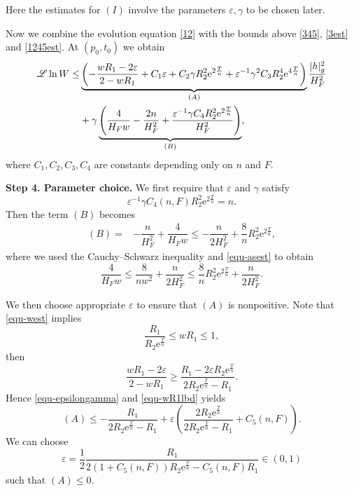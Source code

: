 \documentclass[10pt,a4paper]{amsart}
\numberwithin{equation}{section}
\begin{document}
		Here the estimates for $(I)$ involve the parameters $\varepsilon,\gamma$ to be chosen later.
		
		Now we combine the evolution equation \eqref{12} with the bounds above \eqref{345}, \eqref{3est} and \eqref{1245est}. At $(p_0,t_0)$ we obtain
		\begin{align}
			\mathscr{L} \ln W \leq& \underbrace{ \left(-\dfrac{wR_1-2\varepsilon}{2-wR_1} + C_1\varepsilon + C_2\gamma R_2^2 \mathrm{e}^{2\frac{T}{n}} + \varepsilon^{-1}\gamma^2 C_3R_2^4\mathrm{e}^{4\frac{T}{n}} \right)}_{(A)}\dfrac{|h|_{g}^2}{H_F^2} \notag\\
			&+\gamma\underbrace{\left( \dfrac{4}{H_F w}-\dfrac{2n}{H_F^2} + \dfrac{\varepsilon^{-1}\gamma C_4R_2^2\mathrm{e}^{2\frac{T}{n}}}{H_F^2} \right)}_{(B)}, \label{equ-lnww}
		\end{align}
		where $C_1,C_2,C_3,C_4$ are constants depending only on $n$ and $F$.
		
		\textbf{Step 4. Parameter choice.}
		We first require that $\varepsilon$ and $\gamma$ satisfy
		\begin{equation}
			\varepsilon^{-1}\gamma C_4(n,F)R_2^2\mathrm{e}^{2\frac{T}{n}}=n.
			\label{equ-epsilongamma}
		\end{equation}
		Then the term $(B)$ becomes
		\begin{align*}
			(B) =& - \dfrac{n}{H_F^2} + \dfrac{4}{H_F w} 
			\leq  -\dfrac{n}{2H_F^2} + \dfrac{8}{n}R_2^2\mathrm{e}^{2\frac{T}{n}}, %
		\end{align*}
		where we used the Cauchy--Schwarz inequality and \eqref{equ-asest} to obtain
		\begin{equation*}
			\dfrac{4}{H_F w} \leq \dfrac{8}{nw^2} + \dfrac{n}{2H_F^2} \leq \dfrac{8}{n}R_2^2\mathrm{e}^{2\frac{T}{n}} + \dfrac{n}{2H_F^2}.
		\end{equation*}
		
		We then choose appropriate $\varepsilon$ to ensure that $(A)$ is nonpositive. Note that \eqref{equ-west} implies
		\begin{equation*}
			\dfrac{R_1}{R_2\mathrm{e}^{\frac{T}{n}}}\leq wR_1 \leq 1,
		\end{equation*}
		then
		\begin{equation}
			\dfrac{wR_1-2\varepsilon}{2-wR_1}\geq \dfrac{R_1-2\varepsilon R_2\mathrm{e}^{\frac{T}{n}}}{2R_2\mathrm{e}^{\frac{T}{n}} - R_1}.
			\label{equ-wR1lbd}
		\end{equation}
		Hence \eqref{equ-epsilongamma} and \eqref{equ-wR1lbd} yields
		\begin{equation*}
			(A) \leq -\dfrac{R_1}{2R_2\mathrm{e}^{\frac{T}{n}} - R_1} + \varepsilon \left( \dfrac{2R_2\mathrm{e}^{\frac{T}{n}}}{2R_2\mathrm{e}^{\frac{T}{n}}-R_1}+C_5(n,F) \right).
		\end{equation*}
		We can choose
		\begin{equation}
			\varepsilon=\dfrac{1}{2}\dfrac{R_1}{2(1+C_5(n,F))R_2\mathrm{e}^{\frac{T}{n}}-C_5(n,F)R_1}\in (0,1)  \label{equ-epsilon}
		\end{equation}
		such that $(A)\leq 0$.
	
\end{document}
